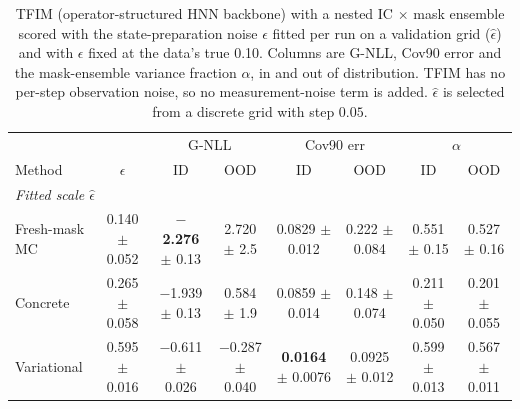\begin{table}[t]
\centering
\small
\setlength{\tabcolsep}{3pt}
\caption{TFIM (operator-structured HNN backbone) with a nested IC $\times$ mask ensemble scored with the state-preparation noise $\epsilon$ fitted per run on a validation grid ($\hat\epsilon$) and with $\epsilon$ fixed at the data's true 0.10. Columns are G-NLL, Cov90 error and the mask-ensemble variance fraction $\alpha$, in and out of distribution. TFIM has no per-step observation noise, so no measurement-noise term is added. $\hat\epsilon$ is selected from a discrete grid with step $0.05$.}
\label{tab:tfim-noise-conventions}
\begin{tabular}{lccccccc}
\toprule
 & & \multicolumn{2}{c}{G-NLL} & \multicolumn{2}{c}{Cov90 err} & \multicolumn{2}{c}{$\alpha$} \\
\cmidrule(lr){3-4}
\cmidrule(lr){5-6}
\cmidrule(lr){7-8}
Method & $\epsilon$ & ID & OOD & ID & OOD & ID & OOD \\
\midrule
\multicolumn{8}{l}{\textit{Fitted scale $\hat\epsilon$}} \\
Fresh-mask MC & \makecell{0.140\\ {\footnotesize $\pm$ 0.052}} & \makecell{\textbf{$-$2.276}\\ {\footnotesize $\pm$ 0.13}} & \makecell{2.720\\ {\footnotesize $\pm$ 2.5}} & \makecell{0.0829\\ {\footnotesize $\pm$ 0.012}} & \makecell{0.222\\ {\footnotesize $\pm$ 0.084}} & \makecell{0.551\\ {\footnotesize $\pm$ 0.15}} & \makecell{0.527\\ {\footnotesize $\pm$ 0.16}} \\
Concrete & \makecell{0.265\\ {\footnotesize $\pm$ 0.058}} & \makecell{$-$1.939\\ {\footnotesize $\pm$ 0.13}} & \makecell{0.584\\ {\footnotesize $\pm$ 1.9}} & \makecell{0.0859\\ {\footnotesize $\pm$ 0.014}} & \makecell{0.148\\ {\footnotesize $\pm$ 0.074}} & \makecell{0.211\\ {\footnotesize $\pm$ 0.050}} & \makecell{0.201\\ {\footnotesize $\pm$ 0.055}} \\
Variational & \makecell{0.595\\ {\footnotesize $\pm$ 0.016}} & \makecell{$-$0.611\\ {\footnotesize $\pm$ 0.026}} & \makecell{$-$0.287\\ {\footnotesize $\pm$ 0.040}} & \makecell{\textbf{0.0164}\\ {\footnotesize $\pm$ 0.0076}} & \makecell{0.0925\\ {\footnotesize $\pm$ 0.012}} & \makecell{0.599\\ {\footnotesize $\pm$ 0.013}} & \makecell{0.567\\ {\footnotesize $\pm$ 0.011}} \\

\end{tabular}
\end{table}
